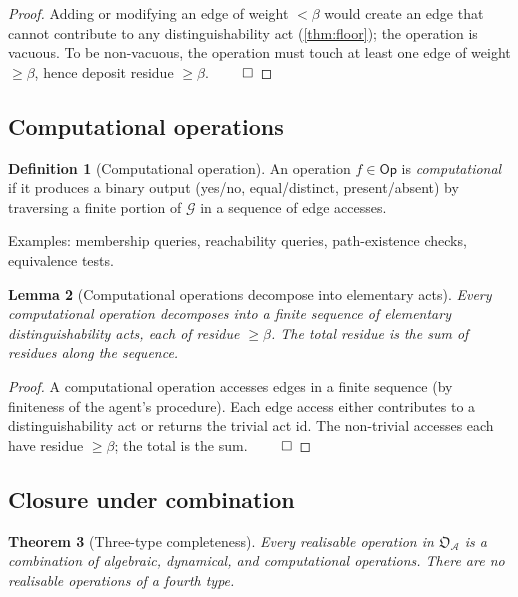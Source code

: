 \documentclass[11pt,a4paper]{article}
\theoremstyle{thmstyle}
\newtheorem{theorem}{Theorem}[section]
\newtheorem{lemma}[theorem]{Lemma}
\theoremstyle{definition}
\newtheorem{definition}[theorem]{Definition}
\theoremstyle{remark}
\newcommand{\Graph}{\mathcal{G}}
\newcommand{\Agent}{\mathcal{A}}
\newcommand{\Op}{\mathsf{Op}}
\newcommand{\floor}{\beta}
\newcommand{\OpStr}{\mathfrak{O}}
\begin{document}
\begin{proof}
Adding or modifying an edge of weight $< \floor$ would create an
edge that cannot contribute to any distinguishability act
(\cref{thm:floor}); the operation is vacuous. To be non-vacuous,
the operation must touch at least one edge of weight $\geq \floor$,
hence deposit residue $\geq \floor$. $\qed$
\end{proof}

\subsection{Computational operations}

\begin{definition}[Computational operation]
\label{def:comp}
An operation $f \in \Op$ is \emph{computational} if it produces a
binary output (yes/no, equal/distinct, present/absent) by traversing
a finite portion of $\Graph$ in a sequence of edge accesses.
\end{definition}

Examples: membership queries, reachability queries, path-existence
checks, equivalence tests.

\begin{lemma}[Computational operations decompose into elementary
acts]
\label{lem:comp_decompose}
Every computational operation decomposes into a finite sequence of
elementary distinguishability acts, each of residue $\geq \floor$.
The total residue is the sum of residues along the sequence.
\end{lemma}

\begin{proof}
A computational operation accesses edges in a finite sequence (by
finiteness of the agent's procedure). Each edge access either
contributes to a distinguishability act or returns the trivial act
$\mathrm{id}$. The non-trivial accesses each have residue
$\geq \floor$; the total is the sum. $\qed$
\end{proof}

\subsection{Closure under combination}

\begin{theorem}[Three-type completeness]
\label{thm:three_types}
Every realisable operation in $\OpStr_\Agent$ is a combination of
algebraic, dynamical, and computational operations. There are no
realisable operations of a fourth type.
\end{theorem}
\end{document}
